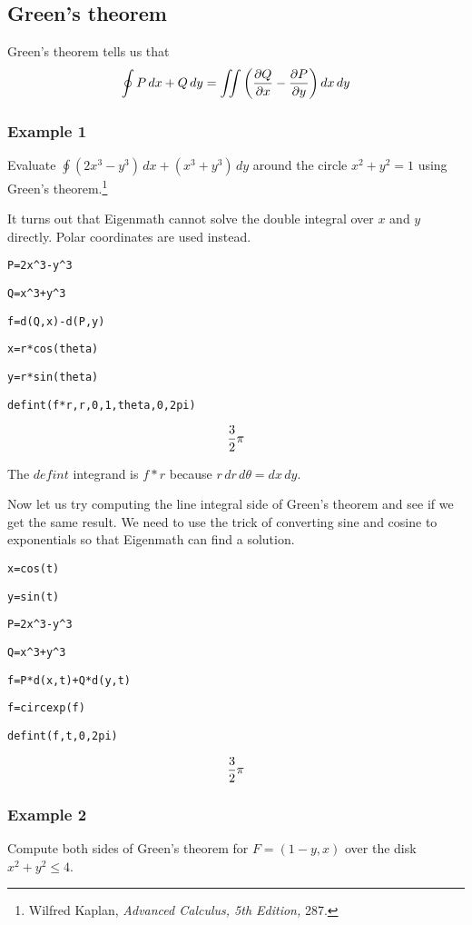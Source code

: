 \subsection{Green's theorem}
Green's theorem tells us that
$$\oint P\,dx+Q\,dy=\int\!\!\!\int
\left({\partial Q\over\partial x}-{\partial P\over\partial y}\right)
dx\,dy$$

\subsubsection{Example 1}
Evaluate $\oint (2x^3-y^3)\,dx+(x^3+y^3)\,dy$ around the circle
$x^2+y^2=1$ using Green's theorem.\footnote{
Wilfred Kaplan, {\it Advanced Calculus, 5th Edition,} 287.}

\medskip
\noindent
It turns out that Eigenmath cannot solve the double integral over
$x$ and $y$ directly.
Polar coordinates are used instead.

\medskip
\verb$P=2x^3-y^3$

\verb$Q=x^3+y^3$

\verb$f=d(Q,x)-d(P,y)$

\verb$x=r*cos(theta)$

\verb$y=r*sin(theta)$

\verb$defint(f*r,r,0,1,theta,0,2pi)$

$${3\over2}\pi$$

\medskip
\noindent
The $defint$ integrand is $f{*}r$ because $r\,dr\,d\theta=dx\,dy$.

\medskip
\noindent
Now let us try computing the line integral side of Green's theorem
and see if we get the same result.
We need to use the trick of converting sine and cosine to exponentials
so that Eigenmath can find a solution.

\medskip
\verb$x=cos(t)$

\verb$y=sin(t)$

\verb$P=2x^3-y^3$

\verb$Q=x^3+y^3$

\verb$f=P*d(x,t)+Q*d(y,t)$

\verb$f=circexp(f)$

\verb$defint(f,t,0,2pi)$

$${3\over2}\pi$$

\subsubsection{Example 2}
Compute both sides of Green's theorem for
$F=(1-y,x)$ over the disk $x^2+y^2\le4$.

